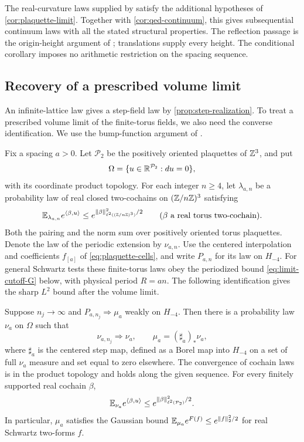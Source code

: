 The real-curvature laws supplied by \cite[Theorem~A]{ChamberLattice}
satisfy the additional hypotheses of \cref{cor:plaquette-limit}.
Together with \cref{cor:qed-continuum}, this gives subsequential
continuum laws with all the stated structural properties. The
reflection passage is the origin-height argument of
\cite[Proposition~6.1]{QED3Manuscript}; translations supply every
height. The conditional corollary imposes no arithmetic restriction
on the spacing sequence.

\subsection{Recovery of a prescribed volume limit}
\label{subsec:fixed-spacing-recovery}\label{sec:recovery}
An infinite-lattice law gives a step-field law by
\cref{prop:step-realization}. To treat a prescribed volume limit
of the finite-torus fields, we also need the converse
identification. We use the bump-function argument of
\cite[Section~6.4]{QED3Manuscript}.

Fix a spacing $a>0$. Let $\mathcal P_2$ be the positively oriented
plaquettes of $\mathbb Z^3$, and put
\[
 \Omega=\{u\in\mathbb R^{\mathcal P_2}:du=0\},
\]
with its coordinate product topology. For each integer $n\ge4$,
let $\lambda_{a,n}$ be a probability law of real closed
two-cochains on $(\mathbb Z/n\mathbb Z)^3$ satisfying
\begin{equation}\label{eq:recovery-finite-gaussian}
 \mathbb E_{\lambda_{a,n}}e^{\langle\beta,u\rangle}
 \le e^{\|\beta\|_{\ell^2((\mathbb Z/n\mathbb Z)^3)}^2/2}
 \qquad(\beta\text{ a real torus two-cochain}).
\end{equation}
Both the pairing and the norm sum over positively oriented torus
plaquettes. Denote the law of the periodic extension by
$\nu_{a,n}$. Use the centered interpolation and coefficients
$f_{[a]}$ of \eqref{eq:plaquette-cells}, and write $P_{a,n}$
for its law on $H_{-4}$.
For general Schwartz tests these finite-torus laws obey the
periodized bound \eqref{eq:limit-cutoff-G} below, with physical
period $R=an$. The following identification gives the sharp
$L^2$ bound after the volume limit.

\begin{proposition}\label{prop:fixed-spacing-recovery}
Suppose $n_j\to\infty$ and $P_{a,n_j}\Longrightarrow\mu_a$
weakly on $H_{-4}$. Then there is a probability law $\nu_a$
on $\Omega$ such that
\begin{equation}\label{eq:limit-volume-identification}
 \nu_{a,n_j}\Longrightarrow\nu_a,\qquad
 \mu_a=(\sharp_a)_*\nu_a,
\end{equation}
where $\sharp_a$ is the centered step map, defined as a Borel
map into $H_{-4}$ on a set of full $\nu_a$ measure and set
equal to zero elsewhere. The convergence of cochain laws is
in the product topology and holds along the given sequence.
For every finitely supported real cochain $\beta$,
\begin{equation}\label{eq:limit-lattice-G}
 \mathbb E_{\nu_a}e^{\langle\beta,u\rangle}
 \le e^{\|\beta\|_{\ell^2(\mathcal P_2)}^2/2}.
\end{equation}
In particular, $\mu_a$ satisfies the Gaussian bound
$\mathbb E_{\mu_a}e^{F(f)}\le e^{\|f\|_2^2/2}$ for real Schwartz
two-forms $f$.
\end{proposition}

